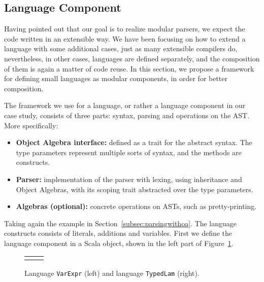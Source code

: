 
\subsection{Language Component}

Having pointed out that our goal is to realize modular parsers, we expect the code written in an extensible way. We have been focusing on how to extend a language with some additional cases, just as many extensible compilers do, nevertheless, in other cases, languages are defined separately, and the composition of them is again a matter of code reuse. In this section, we propose a framework for defining small languages as modular components, in order for better composition.

The framework we use for a language, or rather a language component in our case study, consists of three parts: syntax, parsing and operations on the AST. More
specifically:
\begin{itemize}
    \item \textbf{Object Algebra interface:} defined as a trait for the abstract syntax. The type parameters represent multiple sorts of syntax, and the methods are constructs.
\item \textbf{Parser:} implementation of the parser with lexing, using inheritance and Object Algebras, with its scoping trait abstracted over the type parameters.
\item \textbf{Algebras (optional):} concrete operations on ASTs, such as pretty-printing.
\end{itemize}

Taking again the example in Section~\ref{subsec:parsingwithoa}. The language constructs consists of literals, additions and variables. First we define the
language component in a Scala object, shown in the left part of Figure~\ref{fig:lng-components}.

\begin{figure}[t]
\begin{tabular}{m{0.42\linewidth}m{0.52\linewidth}}
&
\end{tabular}
\caption{Language \lstinline{VarExpr} (left) and language \lstinline{TypedLam} (right).}\label{fig:lng-components}
\end{figure}

